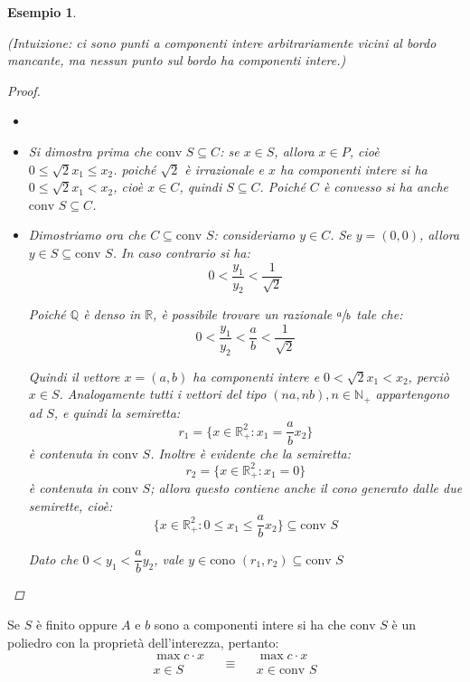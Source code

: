 \documentclass[a4paper,11pt]{book}
\newcommand{\reals}{\mathbb{R}}
\newcommand{\naturals}{\mathbb{N}}
\theoremstyle{break}
\newtheorem{es}[deff]{Esempio}
\begin{document}
\begin{es}
\begin{multicols}{2}
 \end{multicols}

 \begin{center}
 \end{center}
\footnotesize (Intuizione: ci sono punti a componenti intere arbitrariamente vicini al bordo mancante, ma nessun punto sul bordo ha componenti intere.)\normalsize
 \begin{proof} \footnotesize \begin{itemize}
                \item []
                \item 
  Si dimostra prima che $\text{conv } S \subseteq C$: se $x \in S$, allora $x \in P$, cioè $0\leq \sqrt{2} x_1 \leq x_2$. poiché $\sqrt 2$ è irrazionale e $x$ ha componenti intere si ha $0\leq \sqrt{2} x_1 < x_2$, cioè $x \in C$, quindi $S \subseteq C$. Poiché $C$ è convesso si ha anche $\text{conv }S \subseteq C$.
  
  \item Dimostriamo ora che $C \subseteq \text{conv }S$: consideriamo $y \in C$. Se $y = (0,0)$, allora $y \in S \subseteq \text{conv } S$. In caso contrario si ha:
 \[0 < \frac{y_1}{y_2} < \frac{1}{\sqrt{2}}\]
 
 Poiché $\mathbb{Q}$ è denso in $\reals$, è possibile trovare un razionale $\sfrac{a}{b}$ tale che:
 \[0 < \frac{y_1}{y_2} < \frac{a}{b} < \frac{1}{\sqrt{2}}\]
  
  Quindi il vettore $x = (a, b)$ ha componenti intere e $0 < \sqrt{2} x_1 < x_2$, perciò $x \in S$. Analogamente tutti i vettori del tipo $(na, nb), n \in \naturals_+$ appartengono ad $S$, e quindi la semiretta:
  \[r_1 = \Big\{x \in \reals^2_+ : x_1 = \frac{a}{b} x_2\Big\}\]
  è contenuta in $\text{conv }S$. Inoltre è evidente che la semiretta:
  \[r_2 =  \{x \in \reals^2_+ : x_1 = 0\}\]
  è contenuta in $\text{conv }S$; allora questo contiene anche il cono generato dalle due semirette, cioè:
  \[\Big\{ x \in \reals^2_+ : 0 \leq x_1 \leq \dfrac{a}{b} x_2 \Big\} \subseteq \text{conv }S\]
  
  Dato che $0 < y_1 < \dfrac{a}{b}y_2$, vale $y \in \text{cono }(r_1, r_2) \subseteq \text{conv } S$
               \end{itemize}
 
 
 \end{proof}

\end{es}
\smallskip

Se $S$ è finito oppure $A$ e $b$ sono a componenti intere si ha che $\text{conv }S$ è un poliedro con la proprietà dell'interezza, pertanto:
\[\begin{matrix}
   \max c\cdot x\\
   x \in S
  \end{matrix}\quad \equiv \quad\begin{matrix}
   \max c\cdot x\\
   x \in \text{conv }S
  \end{matrix}
\]
\end{document}
